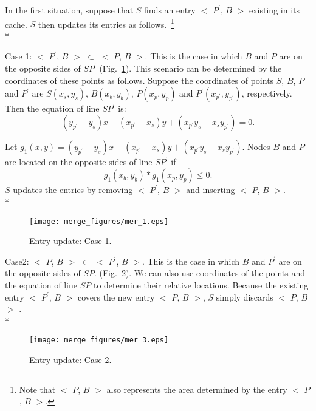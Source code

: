 \documentclass[3p,times]{elsarticle}
\begin{document}
In the first situation, suppose that $S$ finds an entry $<$ $P^{'}$, $B$ $>$ existing in its cache. $S$ then updates
its entries as follows.~\footnote{Note that $<$ $P$, $B$ $>$ also represents the area determined by
the entry $<$ $P$, $B$ $>$.}\\*


Case 1: $<$ $P^{'}$, $B$ $>$ $\subset$ $<$ $P$, $B$ $>$. This is the case in which $B$ and $P$ are on the opposite sides of $SP^{'}$
(Fig.~\ref{fig3_6}). This scenario can be determined by the coordinates of these points as follows. Suppose
the coordinates of points $S$, $B$, $P$ and $P^{'}$  are $S(x_s,y_s)$, $B(x_b,y_b)$,
$P(x_p,y_p)$ and $P^{'}(x_{p^{'}},y_{p^{'}})$, respectively. Then the equation of line $SP^{'}$  is:
\[(y_{p^{'}}-y_s)x-(x_{p^{'}}-x_s)y+(x_{p^{'}}y_s-x_sy_{p^{'}})=0. \]

Let $g_1(x,y) = (y_{p^{'}}-y_s)x-(x_{p^{'}}-x_s)y+(x_{p^{'}}y_s-x_sy_{p^{'}})$.
Nodes $B$ and $P$ are located on the opposite sides of line $SP^{'}$
if
\begin{equation}
g_1(x_b,y_b) * g_1(x_p, y_p) \le 0.
\label{eqm}
\end{equation}
$S$ updates the entries by removing $<$ $P^{'}$, $B$ $>$ and inserting $<$ $P$, $B$ $>$. \\*

\begin{figure}[!htp]
\begin{center}
\texttt{[image: merge\_figures/mer\_1.eps]}
\end{center}
\caption{Entry update: Case 1.}
\label{fig3_6}
\end{figure}





Case2: $<$ $P$, $B$ $>$  $\subset$  $<$ $P^{'}$, $B$ $>$. This is the case in which $B$ and $P^{'}$ are on the opposite sides of $SP$.
(Fig.~\ref{fig3_7}). We can also use coordinates of the points and the equation of line $SP$ to determine their relative locations.
Because the existing entry $<$ $P^{'}$, $B$ $>$
covers the new entry $<$ $P$, $B$ $>$, $S$ simply discards $<$ $P$, $B$ $>$ . \\*

\begin{figure}[!htp]
\begin{center}
\texttt{[image: merge\_figures/mer\_3.eps]}
\end{center}
\caption{Entry update: Case 2.}
\label{fig3_7}
\end{figure}
\end{document}
